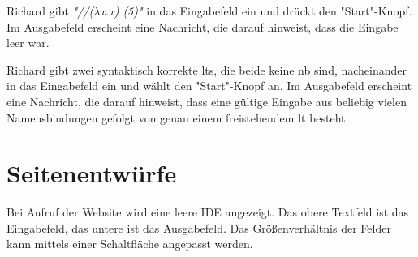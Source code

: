 \documentclass[parskip=full,11pt,twoside]{scrartcl}
\begin{document}
{Richard gibt \emph{"//($\lambda$x.x) (5)"} in das Eingabefeld ein und drückt den "Start"-Knopf.}
{Im Ausgabefeld erscheint eine Nachricht, die darauf hinweist, dass die Eingabe leer war.}

{Richard gibt zwei syntaktisch korrekte \glspl{lt}, die beide keine \gls{nb} sind, nacheinander
in das Eingabefeld ein und wählt den "Start"-Knopf an.}
{Im Ausgabefeld erscheint eine Nachricht, die darauf hinweist, dass eine gültige Eingabe
aus beliebig vielen Namensbindungen gefolgt von genau einem freistehendem \gls{lt} besteht.}
%
%
%

\pagebreak
\appendix

\section{Seitenentwürfe}


Bei Aufruf der Website wird eine leere IDE angezeigt. Das obere Textfeld ist das Eingabefeld, das untere ist das Ausgabefeld. Das Größenverhältnis der Felder kann mittels einer Schaltfläche angepasst werden.
\end{document}
